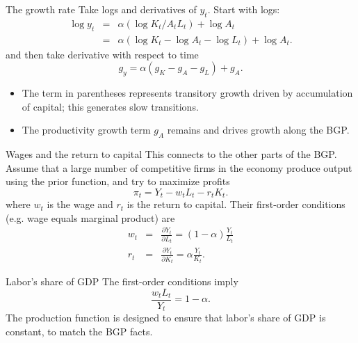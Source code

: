 \begin{frame}{The growth rate}
Take logs and derivatives of $y_t$. Start with logs:
\begin{eqnarray}
	\log y_t &=& \alpha (\log K_t/A_tL_t) + \log A_t \nonumber \\ 
	       &=& \alpha (\log K_t - \log A_t - \log L_t) + \log A_t. \label{EQ_logy}
\end{eqnarray}
and then take derivative with respect to time
\begin{equation}
	g_y = \alpha (g_K - g_A - g_L) + g_A. \label{EQ_gy}
\end{equation}

\begin{itemize}
	\item The term in parentheses represents transitory growth driven by accumulation of capital; this generates slow transitions. 
	\item The productivity growth term $g_A$ remains and drives growth along the BGP.
\end{itemize}
\end{frame}

\begin{frame}{Wages and the return to capital}
This connects to the other parts of the BGP. Assume that a large number of competitive firms in the economy produce output using the prior function, and try to maximize profits
\begin{equation}
	\pi_t = Y_t - w_tL_t - r_tK_t. \nonumber
\end{equation}
where $w_t$ is the wage and $r_t$ is the return to capital. Their first-order conditions (e.g. wage equals marginal product) are
\begin{eqnarray}
	w_t &=& \frac{\partial Y_t}{\partial L_t} = (1-\alpha)\frac{Y_t}{L_t} \nonumber \\ 
	r_t &=& \frac{\partial Y_t}{\partial K_t} = \alpha \frac{Y_t}{K_t}. \nonumber
\end{eqnarray} 
\end{frame}

\begin{frame}{Labor's share of GDP}
The first-order conditions imply
\begin{equation}
	\frac{w_tL_t}{Y_t} = 1-\alpha. \nonumber
\end{equation}
The production function is designed to ensure that labor's share of GDP is constant, to match the BGP facts.
\end{frame}

